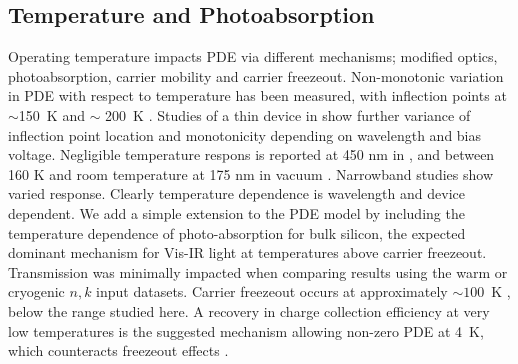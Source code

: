 \subsection{Temperature and Photoabsorption}
\label{model:temp}
Operating temperature impacts PDE via different mechanisms; modified optics, photoabsorption, carrier mobility and carrier freezeout. Non-monotonic variation in PDE with respect to temperature has been measured, with inflection points at $\sim$150~K \cite{biroth_icasipm_2018} and $\sim$ 200~K \cite{sipm_temp_pde_collazuol_2011}. Studies of a thin device in \cite{acerbi_2023} show further variance of inflection point location and monotonicity depending on wavelength and bias voltage. Negligible temperature respons is reported at 450 nm in \cite{cryogenic_2025_rivera}, and between 160 K and room temperature at 175 nm in vacuum \cite{gallina_performance_2022}. Narrowband studies \cite{garrote_2024_cryoPDE, Wang_2021_cryo_sCurve, Borden_pdeTemp_2024, gu_2025_heliumPDE,PKLightfoot_2008} show varied response. Clearly temperature dependence is wavelength and device dependent. We add a simple extension to the PDE model by including the temperature dependence of photo-absorption for bulk silicon, the expected dominant mechanism for Vis-IR light at temperatures above carrier freezeout. Transmission was minimally impacted when comparing results using the warm or cryogenic $n, k$ input datasets. Carrier freezeout occurs at approximately $\sim 100$~K \cite{biroth_2015_cryogenic}, below the range studied here. A recovery in charge collection efficiency at very low temperatures is the suggested mechanism allowing non-zero PDE at 4~K, which counteracts freezeout effects \cite{biroth_2015_cryogenic, cce_cryogenic_1998}.

